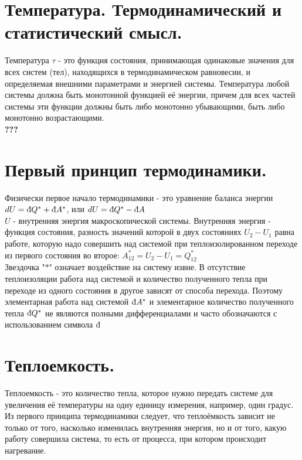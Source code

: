 \begin{multicols*}{2}
		\section{Температура. Термодинамический и статистический смысл.}
		Температура $\tau$ - это функция состояния, принимающая одинаковые значения для всех систем (тел), находящихся в термодинамическом равновесии, и определяемая внешними параметрами и энергией системы. Температура любой системы должна быть монотонной функцией её энергии, причем для всех частей системы эти функции должны быть либо монотонно убывающими, быть либо монотонно возрастающими.\\
		\textbf{???}

		\section{Первый принцип термодинамики.}
		Физически первое начало термодинамики - это уравнение баланса энергии\\
		$dU = \text{\dj}Q^* + \text{\dj}A^*$, или $dU = \text{\dj}Q^* - \text{\dj}A$\\
		$U$ - внутренняя энергия макроскопической системы. Внутренняя энергия - функция состояния, разность значений которой в двух состояниях $U_2 - U_1$ равна работе, которую надо совершить над системой при теплоизолированном переходе из первого состояния во второе: $A^*_{12} = U_2 - U_1 = Q^*_{12}$\\
		Звездочка "$*$" означает воздействие на систему извне. В отсутствие теплоизоляции работа над системой и количество полученного тепла при переходе из одного состояния в другое зависят от способа перехода. Поэтому элементарная работа над системой $\text{\dj}A^*$ и элементарное количество полученного тепла $\text{\dj}Q^*$ не являются полными дифференциалами и часто обозначаются с использованием символа $\text{\dj}$

		\section{Теплоемкость.}
		Теплоемкость - это количество тепла, которое нужно передать системе для увеличения её температуры на одну единицу измерения, например, один градус. Из первого принципа термодинамики следует, что теплоёмкость зависит не только от того, насколько изменилась внутренняя энергия, но и от того, какую работу совершила система, то есть от процесса, при котором происходит нагревание.


\end{multicols*}
